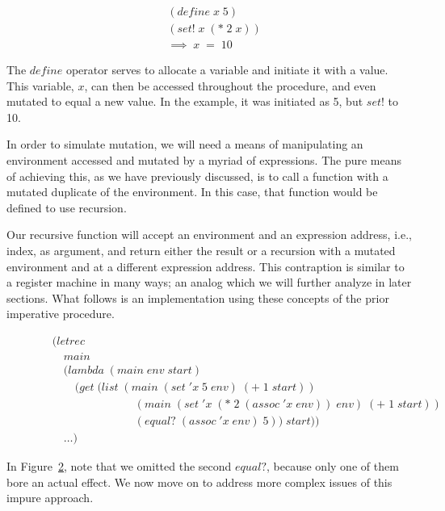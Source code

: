 \begin{figure}[htp]
\footnotesize
\caption{}\label{fig:defineSetExample}
\begin{align*}
& (define \; x \; 5)
\\& (set! \; x \; (* \; 2 \; x))
\\& \implies \; x \; = \; 10
\end{align*}
\end{figure}

The $define$ operator serves to allocate a variable and initiate it with a value. 
This variable, $x$, can then be accessed throughout the procedure, and even mutated 
to equal a new value. In the example, it was initiated as 5, but $set!$ to 10.

In order to simulate mutation, we will need a means of manipulating an environment
accessed and mutated by a myriad of expressions. The pure means of achieving this,
as we have previously discussed, is to call a function with a mutated duplicate of
the environment. In this case, that function would be defined to use recursion.

Our recursive function will accept an environment and an expression address, i.e.,
index, as argument, and return either the result or a recursion with a mutated
environment and at a different expression address. This contraption is similar to 
a register machine in many ways; an analog which we will further analyze in later
sections. What follows is an implementation using these concepts of the prior
imperative procedure.

\begin{figure}[htp]
\footnotesize
\caption{}\label{fig:recursiveImper}
\begin{align*}
& (letrec \; 
\\& \quad main \; 
\\& \quad (lambda \; (main \; env \; start)
\\& \qquad (get \; (list \; (main \; (set \; 'x \; 5 \; env) \; (+ \; 1 \; start))
\\& \qquad \qquad \qquad \quad \; (main \; (set \; 'x \; (* \; 2 \; (assoc \; 'x \; env)) \; env) \; (+ \; 1 \; start))
\\& \qquad \qquad \qquad \quad \; (equal? \; (assoc \; 'x \; env) \; 5)) \; start))
\\& \quad \dots)
\end{align*}
\end{figure}

In Figure~\ref{fig:recursiveImper}, note that we omitted the second $equal?$,
because only one of them bore an actual effect. We now move on to address more
complex issues of this impure approach.

